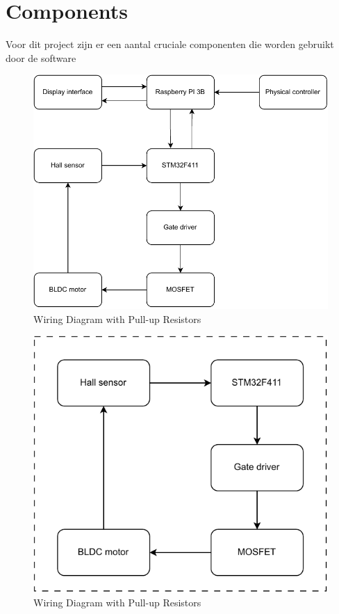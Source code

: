 \section{Components}
Voor dit project zijn er een aantal cruciale componenten die worden gebruikt door de software
\begin{figure}[H]
    \centering
    \includegraphics[width=1\textwidth]{img/DrawIO/Componentdiagram.pdf}
    \caption{Wiring Diagram with Pull-up Resistors}
    \label{fig:hall_sensor_wiring_diagram}
\end{figure}

\begin{figure}[H]
    \centering
    \includegraphics[width=1\textwidth]{img/DrawIO/Motordriver.pdf}
    \caption{Wiring Diagram with Pull-up Resistors}
    \label{fig:hall_sensor_wiring_diagram}
\end{figure}

